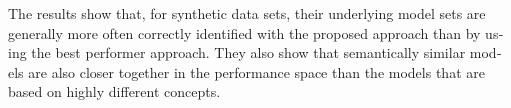 \begin{otherlanguage}{english}
The results show that, for synthetic data sets, their underlying model sets are generally more often correctly identified with the proposed approach than by using the best performer approach.  They also show that semantically similar models are also closer together in the performance space than the models that are based on highly different concepts.



\end{otherlanguage}
